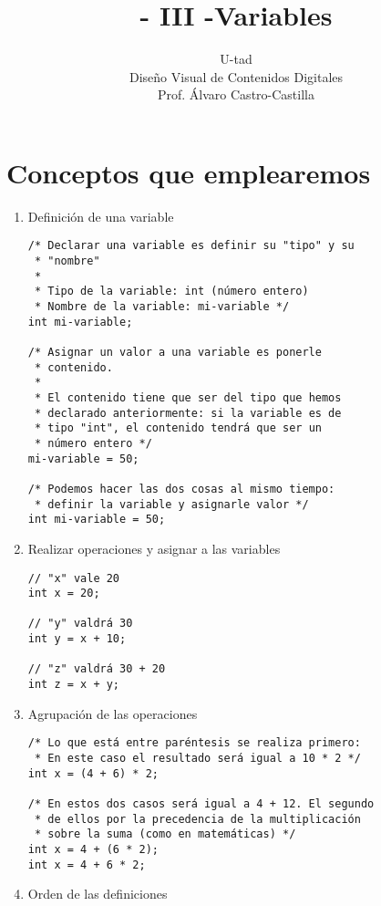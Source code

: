 \documentclass[a4paper,oneside]{article}
\title{- III -\linebreak Variables}
\author{U-tad\\ Diseño Visual de Contenidos Digitales\\ Prof. Álvaro Castro-Castilla}
\date{}
\begin{document}
\maketitle


\section{Conceptos que emplearemos}
\begin{enumerate}
  \item Definición de una variable

    \begin{verbatim}
/* Declarar una variable es definir su "tipo" y su
 * "nombre"
 *
 * Tipo de la variable: int (número entero)
 * Nombre de la variable: mi-variable */
int mi-variable;

/* Asignar un valor a una variable es ponerle
 * contenido.
 *
 * El contenido tiene que ser del tipo que hemos
 * declarado anteriormente: si la variable es de
 * tipo "int", el contenido tendrá que ser un
 * número entero */
mi-variable = 50;

/* Podemos hacer las dos cosas al mismo tiempo:
 * definir la variable y asignarle valor */
int mi-variable = 50;
    \end{verbatim}

  \item Realizar operaciones y asignar a las variables

    \begin{verbatim}
// "x" vale 20
int x = 20;

// "y" valdrá 30
int y = x + 10;

// "z" valdrá 30 + 20
int z = x + y;
    \end{verbatim}

  \newpage
  \item Agrupación de las operaciones

    \begin{verbatim}
/* Lo que está entre paréntesis se realiza primero:
 * En este caso el resultado será igual a 10 * 2 */
int x = (4 + 6) * 2;

/* En estos dos casos será igual a 4 + 12. El segundo
 * de ellos por la precedencia de la multiplicación
 * sobre la suma (como en matemáticas) */
int x = 4 + (6 * 2);
int x = 4 + 6 * 2;
    \end{verbatim}

  \item Orden de las definiciones


\end{enumerate}
\end{document}

